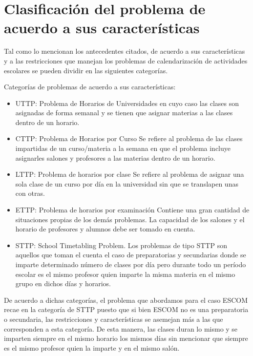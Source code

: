 \label{sec:marcoTeo}
	
	\section{Clasificación del problema de acuerdo a sus características}
	Tal como lo mencionan los antecedentes citados, de acuerdo a sus características y a las restricciones que manejan los problemas de calendarización de actividades escolares se pueden dividir en las siguientes categorías.
	
		Categorías de problemas de acuerdo a sus características:
	
	\begin{itemize}
		\item UTTP: Problema de Horarios de Universidades
		en cuyo caso las clases son asignadas de forma semanal y se tienen que asignar materias a las clases dentro de un horario.
		
		\item CTTP: Problema de Horarios por Curso
		Se refiere al problema de las clases impartidas de un curso/materia a la semana en que el problema incluye asignarles salones y profesores a las materias dentro de un horario.
		
		\item LTTP: Problema de horarios por clase
		Se refiere al problema de asignar una sola clase de un curso por día en la universidad sin que se translapen unas con otras.
		
		\item ETTP: Problema de horarios por examinación
		Contiene una gran cantidad de situaciones propias de los demás problemas. La capacidad de los salones y el horario de profesores y alumnos debe ser tomado en cuenta.
		
		\item STTP: School Timetabling Problem. Los problemas de tipo STTP son aquellos que toman el cuenta el caso de preparatorias y secundarias donde se imparte determinado número de clases por día pero durante todo un período escolar es el mismo profesor quien imparte la misma materia en el mismo grupo en dichos días y horarios.  
	\end{itemize}

	De acuerdo a dichas categorías, el problema que abordamos para el caso ESCOM recae en la categoría de STTP puesto que si bien ESCOM no es una preparatoria o secundaria, las restricciones y características se asemejan más a las que corresponden a esta categoría. De esta manera, las clases duran lo mismo y se imparten siempre en el mismo horario los mismos días sin mencionar que siempre es el mismo profesor quien la imparte y en el mismo salón.
	
